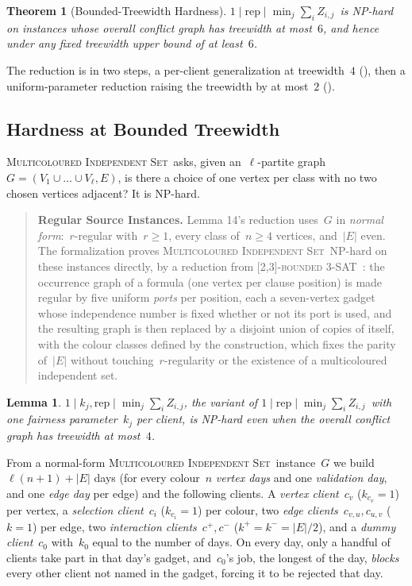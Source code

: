 \documentclass[11pt,a4paper]{article}
\newtheorem{theorem}{Theorem}
\newtheorem{lemma}{Lemma}
\theoremstyle{definition}
\newcommand{\threefield}[3]{$#1\mid#2\mid#3$}
\newcommand{\rep}{\mathrm{rep}}
\newcommand{\EQUIJIT}{\threefield{1}{\rep}{\min_j \sum_i Z_{i,j}}}
\newcommand{\WEQUIJIT}{\threefield{1}{k_j,\rep}{\min_j \sum_i Z_{i,j}}}
\newcommand{\MCIS}{\textsc{Multicoloured Independent Set}}
\newcommand{\SAT}{[2,3]-\textsc{bounded 3-SAT}}
\begin{document}
\setcounter{theorem}{3}
\begin{theorem}[Bounded-Treewidth Hardness]
\label{thm:4a}
\EQUIJIT\ is NP-hard on instances whose overall conflict graph has treewidth at most~$6$, and hence under any fixed treewidth upper bound of at least~$6$.
\end{theorem}
The reduction is in two steps, a per-client generalization at treewidth~$4$
(), then a uniform-parameter reduction raising the treewidth by at most~$2$
().

\subsection{Hardness at Bounded Treewidth}

\MCIS\ asks, given an~$\ell$-partite graph~$G=(V_1\cup\dots\cup V_\ell,E)$, is there a choice of
one vertex per class with no two chosen vertices adjacent? It is NP-hard.

\begin{quote}
\textbf{Regular Source Instances.} Lemma 14's reduction uses~$G$ in \emph{normal form}:~$r$-regular with~$r\ge1$, every class of~$n\ge4$ vertices, and~$|E|$ even.
The formalization proves \MCIS\ NP-hard on these instances directly, by a
reduction from \SAT~\cite{Tovey84}: the occurrence graph of a formula (one vertex per
clause position) is made regular by five uniform \emph{ports} per
position, each a seven-vertex gadget whose independence number is fixed whether or not its
port is used, and the resulting graph is then replaced by a disjoint union of copies of
itself, with the colour classes defined by the construction, which fixes the parity of~$|E|$ without
touching~$r$-regularity or the existence of a multicoloured independent set.
\end{quote}

\setcounter{lemma}{13}
\begin{lemma}
\label{lem:14}
\WEQUIJIT, the variant of \EQUIJIT\ with one fairness parameter~$k_j$ per client, is NP-hard even when the overall conflict graph has
treewidth at most~$4$.
\end{lemma}
From a normal-form \MCIS\ instance~$G$ we build~$\ell(n+1)+|E|$ days (for every colour~$n$
\emph{vertex days} and one \emph{validation day}, and one \emph{edge day} per edge) and
the following clients. A \emph{vertex client}~$c_v$ ($k_{c_v}=1$) per vertex, a \emph{selection client}~$c_i$ ($k_{c_i}=1$) per colour, two \emph{edge clients}~$c_{v,u},c_{u,v}$ ($k=1$) per
edge, two \emph{interaction clients}~$c^+,c^-$ ($k^+=k^-=|E|/2$), and a \emph{dummy client}~$c_0$ with~$k_0$ equal to the number of days. On every day, only a handful of clients take
part in that day's gadget, and~$c_0$'s job, the longest of the day, \emph{blocks} every
other client not named in the gadget, forcing it to be rejected that day.
\end{document}
